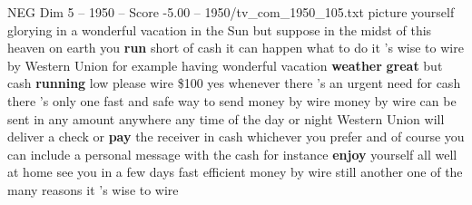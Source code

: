 \begin{textsample}{NEG Dim 5 – 1950 – Score -5.00 – 1950/tv\_com\_1950\_105.txt}  \label{ex:f5_neg_045}
picture yourself glorying in a wonderful vacation in the Sun but suppose in the midst of this heaven on earth you \textbf{run} short of cash it can happen what to do it 's wise to wire by Western Union for example having wonderful vacation \textbf{weather} \textbf{great} but cash \textbf{running} low please wire \$100 yes whenever there 's an urgent need for cash there 's only one fast and safe way to send money by wire money by wire can be sent in any amount anywhere any time of the day or night Western Union will deliver a check or \textbf{pay} the receiver in cash whichever you prefer and of course you can include a personal message with the cash for instance \textbf{enjoy} yourself all well at home see you in a few days fast efficient money by wire still another one of the many reasons it 's wise to wire

\end{textsample}

